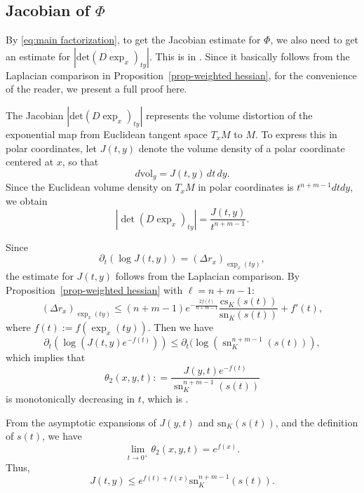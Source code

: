 \documentclass[psamsfonts]{amsart}
\newtheorem{prop}[thm]{Proposition}
\theoremstyle{definition}
\theoremstyle{remark}
\numberwithin{equation}{section}
\begin{document}
\subsection{Jacobian of $\Phi$} By \eqref{eq:main factorization}, to get the Jacobian estimate for $\Phi$, we also need to get an estimate for $|\mathrm{det} (D\exp_{  x})_{  t  y}|$. This is in \cite{wylie2016geometry}. Since it basically follows from the Laplacian comparison in Proposition~\ref{prop-weighted hessian}, for the convenience of the reader, we present a full proof here. 

The Jacobian $|\mathrm{det} (D\exp_{  x})_{  t  y}|$ represents the volume distortion of the exponential map from Euclidean tangent space $T_x M$ to $M$.
To express this in polar coordinates,
let $J(t,y)$ denote the volume density of a polar coordinate centered at $x$, so that $$d \mathrm{vol}_g = J(t,y) \,dt \,dy.$$
Since the Euclidean volume density on $T_x M$ in polar coordinates is $t^{n+m-1} dt dy$,
we obtain
$$|\operatorname{det} ( D \exp_x)_{ty}| = \frac{J(t,y)}{t^{n+m-1}}.$$

Since $$\partial_t (\log J(t,y)) = (\Delta r_x)_{\exp_x (ty)},$$ the estimate for $J(t,y)$ follows from the Laplacian comparison. 
By  Proposition~\ref{prop-weighted hessian} with $\ell = n+m-1$:
$$(\Delta r_x)_{\exp_x (ty)} \leq (n+m-1) e^{-\frac{2f(t)}{n+m-1}} \frac{\mathrm{cs}_K(s(t))}{\mathrm{sn}_K(s(t))} + f'(t),$$
where $f(t) := f(\exp_x(ty))$.
Then we have
$$\partial_t(\log (J(t,y) e^{-f(t)})) \leq \partial_t (\log (\operatorname{sn}_K^{n+m-1} (s(t))),$$
which implies that 
\begin{equation}\label{def:theta-2}
    \theta_2(x,y,t) : = \frac{J(y,t) e^{-f(t)}}{\operatorname{sn}_K^{n+m-1}(s(t))}
\end{equation}
is monotonically decreasing in $t$, which is {\cite[Lemma 4.3]{wylie2016geometry}}.

From the asymptotic expansions of $J(y,t)$ and $\mathrm{sn}_K(s(t))$, and the definition of $s(t)$, we have
$$\lim_{t \to 0^+}\theta_2 (x,y,t) = e^{f(x)}.$$
Thus,
$$J(t,y) \leq e^{f(t) + f(x)}\mathrm{sn}_K^{n+m-1}(s(t)).$$


    
\end{document}
